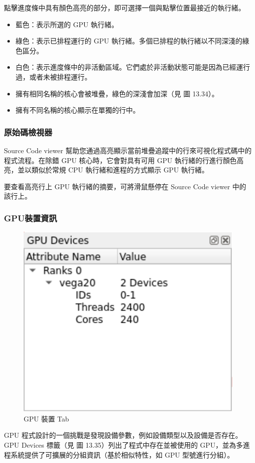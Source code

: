 點擊進度條中具有顏色高亮的部分，即可選擇一個與點擊位置最接近的執行緒。
\begin{itemize}
    \item 藍色：表示所選的 GPU 執行緒。
    \item 綠色：表示已排程運行的 GPU 執行緒。多個已排程的執行緒以不同深淺的綠色區分。
    \item 白色：表示進度條中的非活動區域。它們處於非活動狀態可能是因為已經運行過，或者未被排程運行。
    \item 擁有相同名稱的核心會被堆疊，綠色的深淺會加深（見 圖 13.34）。
    \item 擁有不同名稱的核心顯示在單獨的行中。
\end{itemize}


\subsubsection{原始碼檢視器}

Source Code viewer 幫助您通過高亮顯示當前堆疊追蹤中的行來可視化程式碼中的程式流程。在除錯 GPU 核心時，它會對具有可用 GPU 執行緒的行進行顏色高亮，並以類似於常規 CPU 執行緒和進程的方式顯示 GPU 執行緒。

要查看高亮行上 GPU 執行緒的摘要，可將滑鼠懸停在 Source Code viewer 中的該行上。


\subsubsection{GPU裝置資訊}

\begin{figure}
    \centering
    \includegraphics[width=0.4\linewidth]{FileAusiliari/Screenshots/Figure13-35.png}
    \caption{GPU 裝置 Tab}
    \label{fig:PAPI35}
\end{figure}

GPU 程式設計的一個挑戰是發現設備參數，例如設備類型以及設備是否存在。GPU Devices 標籤（見 圖 13.35）列出了程式中存在並被使用的 GPU，並為多進程系統提供了可擴展的分組資訊（基於相似特性，如 GPU 型號進行分組）。

